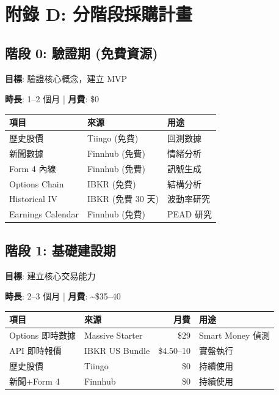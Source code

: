 \documentclass[11pt,a4paper]{article}
\begin{document}
\newpage
\section*{附錄 D: 分階段採購計畫}

\subsection*{階段 0: 驗證期 (免費資源)}

\textbf{目標}: 驗證核心概念，建立 MVP

\textbf{時長}: 1--2 個月 | \textbf{月費}: \$0

\begin{table}[H]
\centering
\begin{tabular}{@{}lll@{}}
\toprule
\textbf{項目} & \textbf{來源} & \textbf{用途} \\
\midrule
歷史股價 & Tiingo (免費) & 回測數據 \\
新聞數據 & Finnhub (免費) & 情緒分析 \\
Form 4 內線 & Finnhub (免費) & 訊號生成 \\
Options Chain & IBKR (免費) & 結構分析 \\
Historical IV & IBKR (免費 30 天) & 波動率研究 \\
Earnings Calendar & Finnhub (免費) & PEAD 研究 \\
\bottomrule
\end{tabular}
\end{table}

\subsection*{階段 1: 基礎建設期}

\textbf{目標}: 建立核心交易能力

\textbf{時長}: 2--3 個月 | \textbf{月費}: \textasciitilde\$35--40

\begin{table}[H]
\centering
\begin{tabular}{@{}llrl@{}}
\toprule
\textbf{項目} & \textbf{來源} & \textbf{月費} & \textbf{用途} \\
\midrule
Options 即時數據 & Massive Starter & \$29 & Smart Money 偵測 \\
API 即時報價 & IBKR US Bundle & \$4.50--10 & 實盤執行 \\
歷史股價 & Tiingo & \$0 & 持續使用 \\
新聞+Form 4 & Finnhub & \$0 & 持續使用 \\
\bottomrule
\end{tabular}
\end{table}
\end{document}
